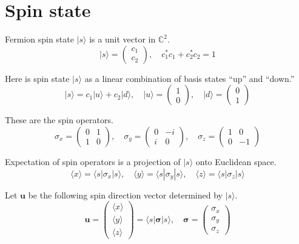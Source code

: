 

\section*{Spin state}

Fermion spin state $|s\rangle$ is a unit vector in $\mathbb{C}^2$.
\begin{equation*}
|s\rangle=\begin{pmatrix}c_1\\c_2\end{pmatrix},
\quad
c_1^*c_1+c_2^*c_2=1
\end{equation*}

Here is spin state $|s\rangle$ as a linear combination of basis states ``up'' and ``down.''
\begin{equation*}
|s\rangle=c_1|u\rangle+c_2|d\rangle,
\quad
|u\rangle=\begin{pmatrix}1\\0\end{pmatrix},
\quad
|d\rangle=\begin{pmatrix}0\\1\end{pmatrix}
\end{equation*}

These are the spin operators.
\begin{equation*}
\sigma_x=\begin{pmatrix}0&1\\1&0\end{pmatrix},
\quad
\sigma_y=\begin{pmatrix}0&-i\\i&0\end{pmatrix},
\quad
\sigma_z=\begin{pmatrix}1&0\\0&-1\end{pmatrix}
\end{equation*}

Expectation of spin operators is a projection of $|s\rangle$ onto Euclidean space.
\begin{equation*}
\langle x\rangle=\langle s|\sigma_x|s\rangle,
\quad
\langle y\rangle=\langle s|\sigma_y|s\rangle,
\quad
\langle z\rangle=\langle s|\sigma_z|s\rangle
\end{equation*}

Let $\mathbf u$ be the following spin direction vector determined by $|s\rangle$.
\begin{equation*}
\mathbf u=\begin{pmatrix}\langle x\rangle\\\langle y\rangle\\\langle z\rangle\end{pmatrix}
=\langle s|\boldsymbol\sigma|s\rangle,
\quad
\boldsymbol\sigma=\begin{pmatrix}\sigma_x\\\sigma_y\\\sigma_z\end{pmatrix}
\end{equation*}

